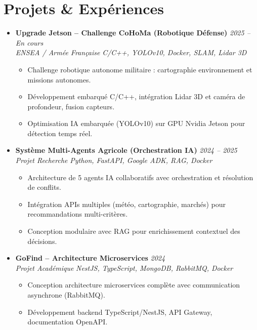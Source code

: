 \documentclass[a4paper,11pt]{article}
\begin{document}
\section{Projets \& Expériences}
\begin{itemize}[leftmargin=*, label={-}]

\item \textbf{Upgrade Jetson -- Challenge CoHoMa (Robotique Défense)} \hfill \textit{2025 -- En cours} \\
\textit{ENSEA / Armée Française} \hfill \textit{C/C++, YOLOv10, Docker, SLAM, Lidar 3D}
\vspace{-2pt}
    \begin{itemize}[leftmargin=0.4cm, nosep, label=\tiny$\bullet$]
        \item \small{Challenge robotique autonome militaire : cartographie environnement et missions autonomes.}
        \item \small{Développement embarqué C/C++, intégration Lidar 3D et caméra de profondeur, fusion capteurs.}
        \item \small{Optimisation IA embarquée (YOLOv10) sur GPU Nvidia Jetson pour détection temps réel.}
    \end{itemize}
\vspace{3pt}

\item \textbf{Système Multi-Agents Agricole (Orchestration IA)} \hfill \textit{2024 -- 2025} \\
\textit{Projet Recherche} \hfill \textit{Python, FastAPI, Google ADK, RAG, Docker}
\vspace{-2pt}
    \begin{itemize}[leftmargin=0.4cm, nosep, label=\tiny$\bullet$]
        \item \small{Architecture de 5 agents IA collaboratifs avec orchestration et résolution de conflits.}
        \item \small{Intégration APIs multiples (météo, cartographie, marchés) pour recommandations multi-critères.}
        \item \small{Conception modulaire avec RAG pour enrichissement contextuel des décisions.}
    \end{itemize}
\vspace{3pt}

\item \textbf{GoFind -- Architecture Microservices} \hfill \textit{2024} \\
\textit{Projet Académique} \hfill \textit{NestJS, TypeScript, MongoDB, RabbitMQ, Docker}
\vspace{-2pt}
    \begin{itemize}[leftmargin=0.4cm, nosep, label=\tiny$\bullet$]
        \item \small{Conception architecture microservices complète avec communication asynchrone (RabbitMQ).}
        \item \small{Développement backend TypeScript/NestJS, API Gateway, documentation OpenAPI.}
    \end{itemize}
\vspace{3pt}


\end{itemize}
\end{document}
